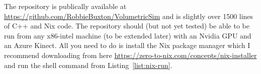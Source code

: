 \begin{invisBox}
    \hfill
\end{invisBox}

The repository is publically available at \url{https://github.com/RobbieBuxton/VolumetricSim} and is slightly over 1500 lines of C++ and Nix code. The repository should (but not yet tested) be able to be run from any x86-intel machine (to be extended later) with an Nvidia GPU and an Azure Kinect. All you need to do is install the Nix package manager which I recommend downloading from here \url{https://zero-to-nix.com/concepts/nix-installer} and run the shell command from Listing~\ref{list:nix-run}.

